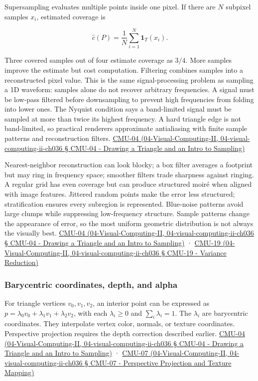 Supersampling evaluates multiple points inside one pixel. If there are \(N\) subpixel samples \(x_i\), estimated coverage is

\[
\widehat c(P)=\frac1N\sum_{i=1}^N\mathbf 1_T(x_i).
\]

Three covered samples out of four estimate coverage as \(3/4\). More samples improve the estimate but cost computation. Filtering combines samples into a reconstructed pixel value. This is the same signal-processing problem as sampling a 1D waveform: samples alone do not recover arbitrary frequencies. A signal must be low-pass filtered before downsampling to prevent high frequencies from folding into lower ones. The Nyquist condition says a band-limited signal must be sampled at more than twice its highest frequency. A hard triangle edge is not band-limited, so practical renderers approximate antialiasing with finite sample patterns and reconstruction filters. \href{}{CMU-04 (04-Visual-Computing-II, 04-visual-computing-ii-ch036 § CMU-04 - Drawing a Triangle and an Intro to Sampling)}

Nearest-neighbor reconstruction can look blocky; a box filter averages a footprint but may ring in frequency space; smoother filters trade sharpness against ringing. A regular grid has even coverage but can produce structured moiré when aligned with image features. Jittered random points make the error less structured; stratification ensures every subregion is represented. Blue-noise patterns avoid large clumps while suppressing low-frequency structure. Sample patterns change the appearance of error, so the most uniform geometric distribution is not always the visually best. \href{}{CMU-04 (04-Visual-Computing-II, 04-visual-computing-ii-ch036 § CMU-04 - Drawing a Triangle and an Intro to Sampling)} · \href{}{CMU-19 (04-Visual-Computing-II, 04-visual-computing-ii-ch036 § CMU-19 - Variance Reduction)}

\subsubsection{Barycentric coordinates, depth, and alpha}\label{barycentric-coordinates-depth-and-alpha}

For triangle vertices \(v_0,v_1,v_2\), an interior point can be expressed as \(p=\lambda_0v_0+\lambda_1v_1+\lambda_2v_2\), with each \(\lambda_i\ge0\) and \(\sum_i\lambda_i=1\). The \(\lambda_i\) are barycentric coordinates. They interpolate vertex color, normals, or texture coordinates. Perspective projection requires the depth correction described earlier. \href{}{CMU-04 (04-Visual-Computing-II, 04-visual-computing-ii-ch036 § CMU-04 - Drawing a Triangle and an Intro to Sampling)} · \href{}{CMU-07 (04-Visual-Computing-II, 04-visual-computing-ii-ch036 § CMU-07 - Perspective Projection and Texture Mapping)}

